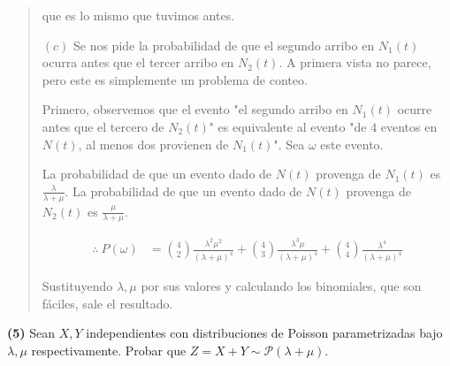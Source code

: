 \documentclass[a4paper, 12pt]{article}
\begin{document}
\begin{quote}
que es lo mismo que tuvimos antes.

$(c)$ Se nos pide la probabilidad de que el segundo arribo en $N_1(t)$ ocurra antes
que el tercer arribo en $N_2(t)$. A primera vista no parece, pero este es
simplemente un problema de conteo. 

Primero, observemos que el evento "el segundo arribo en $N_1(t)$ ocurre antes
que el tercero de $N_2(t)$" es equivalente al evento "de $4$ eventos en $N(t)$,
al menos dos provienen de $N_1(t)$". Sea $\omega$ este evento.

La probabilidad de que un evento dado de $N(t)$ provenga de $N_1(t)$ es
$\frac{\lambda}{\lambda + \mu}$. La probabilidad de que un evento dado de $N(t)$
provenga de $N_2(t)$ es $\frac{\mu}{\lambda + \mu}$.

\begin{align*}
  \therefore ~ P(\omega) 
  &= \binom{4}{2} \frac{\lambda^2\mu^2}{( \lambda + \mu
  )^4} + \binom{4}{3} \frac{\lambda^3 \mu}{(\lambda + \mu)^4} +
  \binom{4}{4}\frac{\lambda^4}{(\lambda+ \mu)^4}
\end{align*}

Sustituyendo $\lambda, \mu$ por sus valores y calculando los binomiales, que son
fáciles, sale el resultado.


\end{quote}
\normalsize

\pagebreak 

\textbf{(5)} Sean $X, Y$ independientes con distribuciones de Poisson
parametrizadas bajo $\lambda, \mu$ respectivamente. Probar que 
$Z = X + Y \sim \mathcal{P}(\lambda + \mu)$.
\end{document}
